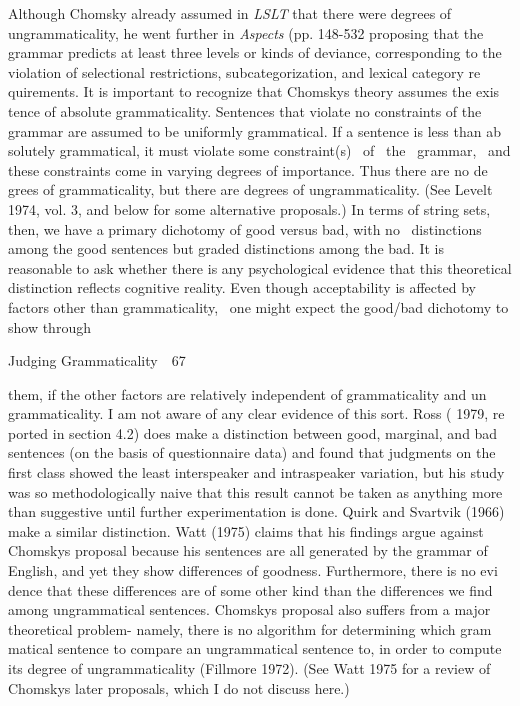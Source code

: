 \begin{styleStandard}
Although Chomsky already assumed in \textit{LSLT}\textit{ }that there were degrees of ungrammaticality, he went further in \textit{Aspects}\textit{ }(pp. 148-532 proposing that the grammar predicts at least three levels or kinds of deviance, corresponding to the violation of selectional restrictions, subcategorization, and lexical category re\- quirements. It is important to recognize that Chomsky{\textquotesingle}s theory assumes the exis\- tence of absolute grammaticality. Sentences that violate no constraints of the grammar are assumed to be uniformly grammatical. If a sentence is less than ab\- solutely grammatical, it must violate some constraint(s) \ of \ the \ grammar, \ and these constraints come in varying degrees of importance. Thus there are no de\- grees of grammaticality, but there are degrees of ungrammaticality. (See Levelt 1974, vol. 3, and below for some alternative proposals.) In terms of string sets, then, we have a primary dichotomy of good versus bad, with no \ distinctions among the good sentences but graded distinctions among the bad. It is reasonable to ask whether there is any psychological evidence that this theoretical distinction reflects cognitive reality. Even though acceptability is affected by factors other than grammaticality, \ one might expect the good/bad dichotomy to show through
\end{styleStandard}


\clearpage\setcounter{page}{1}\begin{styleStandard}
Judging Grammaticality\ \ 67
\end{styleStandard}


\begin{styleTextbody}
them, if the other factors are relatively independent of grammaticality and un\- grammaticality. I am not aware of any clear evidence of this sort. Ross ( 1979, re\- ported in section 4.2) does make a distinction between good, marginal, and bad sentences (on the basis of questionnaire data) and found that judgments on the first class showed the least interspeaker and intraspeaker variation, but his study was so methodologically naive that this result cannot be taken as anything more than suggestive until further experimentation is done. Quirk and Svartvik (1966) make a similar distinction. Watt (1975) claims that his findings argue against Chomsky{\textquotesingle}s proposal because his sentences are all generated by the grammar of English, and yet they show differences of goodness. Furthermore, there is no evi\- dence that these differences are of some other kind than the differences we find among ungrammatical sentences. Chomsky{\textquotesingle}s proposal also suffers from a major theoretical problem- namely, there is no algorithm for determining which gram\- matical sentence to compare an ungrammatical sentence to, in order to compute its degree of ungrammaticality (Fillmore 1972). (See Watt 1975 for a review of Chomsky{\textquotesingle}s later proposals, which I do not discuss here.)
\end{styleTextbody}


